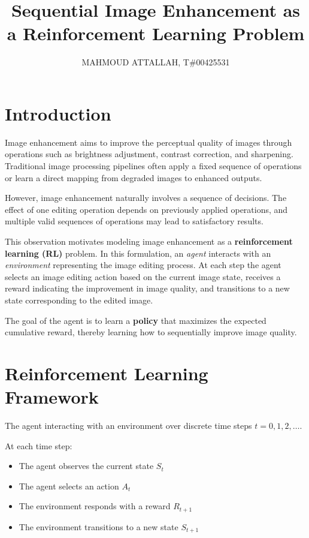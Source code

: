 \documentclass[11pt]{article}
\title{Sequential Image Enhancement as a Reinforcement Learning Problem}
\author{MAHMOUD ATTALLAH, T\#00425531}
\date{}
\begin{document}
\maketitle

\section{Introduction}

Image enhancement aims to improve the perceptual quality of images through operations such as brightness adjustment, contrast correction, and sharpening. 
Traditional image processing pipelines often apply a fixed sequence of operations or learn a direct mapping from degraded images to enhanced outputs.

However, image enhancement naturally involves a sequence of decisions. The effect of one editing operation depends on previously applied operations, and multiple valid sequences of operations may lead to satisfactory results.

This observation motivates modeling image enhancement as a \textbf{reinforcement learning (RL)} problem. In this formulation, an \emph{agent} interacts with an \emph{environment} representing the image editing process. At each step the agent selects an image editing action based on the current image state, receives a reward indicating the improvement in image quality, and transitions to a new state corresponding to the edited image.

The goal of the agent is to learn a \textbf{policy} that maximizes the expected cumulative reward, thereby learning how to sequentially improve image quality.

\section{Reinforcement Learning Framework}

The agent interacting with an environment over discrete time steps $t = 0,1,2,\dots$.

At each time step:

\begin{itemize}
\item The agent observes the current state $S_t$
\item The agent selects an action $A_t$
\item The environment responds with a reward $R_{t+1}$
\item The environment transitions to a new state $S_{t+1}$
\end{itemize}
\end{document}
